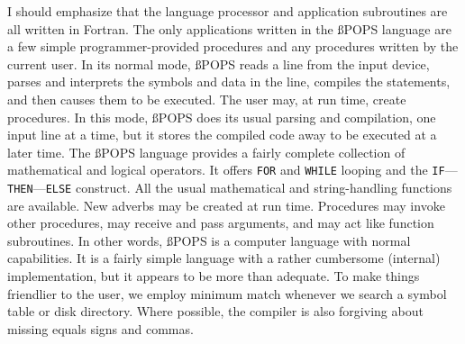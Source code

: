 \noindent I should emphasize that the language processor and application
subroutines are all written in Fortran.  The only applications written
in the {\ss POPS} language are a few simple programmer-provided procedures
and any procedures written by the current user.  In its normal mode,
{\ss POPS} reads a line from the input device, parses and interprets the
symbols and data in the line, compiles the statements, and then causes
them to be executed.  The user may, at run time, create procedures.
In this mode, {\ss POPS} does its usual parsing and compilation, one input
line at a time, but it stores the compiled code away to be executed at
a later time.  The {\ss POPS} language provides a fairly complete collection
of mathematical and logical operators.  It offers {\tt FOR} and
{\tt WHILE} looping and the {\tt IF}---{\tt THEN}---{\tt ELSE}
construct.  All the usual mathematical and string-handling functions
are available.  New adverbs may be created at run time.  Procedures
may invoke other procedures, may receive and pass arguments, and may
act like function subroutines.  In other words, {\ss POPS} is a computer
language with normal capabilities.  It is a fairly simple language
with a rather cumbersome (internal) implementation, but it appears to be
more than adequate.  To make things friendlier to the user, we employ
minimum match whenever we search a symbol table or disk directory.
Where possible, the compiler is also forgiving about missing equals
signs and commas.\pd

